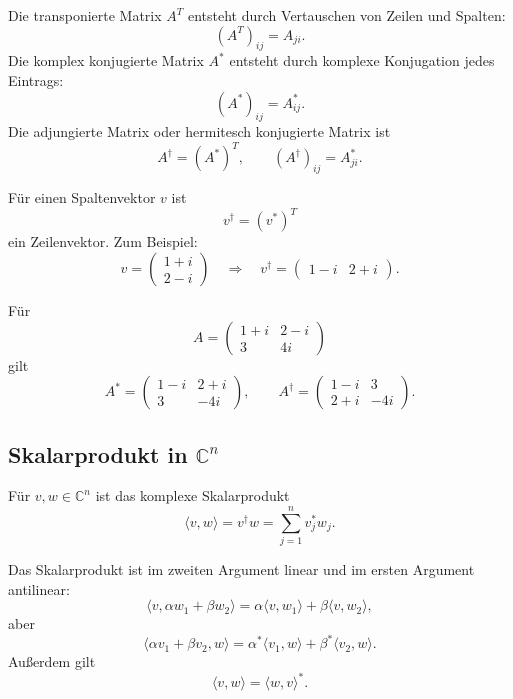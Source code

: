 \begin{definitionbox}
Die transponierte Matrix $A^T$ entsteht durch Vertauschen von Zeilen und Spalten:
\[
    (A^T)_{ij}=A_{ji}.
\]
Die komplex konjugierte Matrix $A^*$ entsteht durch komplexe Konjugation jedes Eintrags:
\[
    (A^*)_{ij}=A_{ij}^*.
\]
Die adjungierte Matrix oder hermitesch konjugierte Matrix ist
\[
    A^\dagger=(A^*)^T,
    \qquad (A^\dagger)_{ij}=A_{ji}^*.
\]
\end{definitionbox}

Für einen Spaltenvektor $v$ ist
\[
    v^\dagger = (v^*)^T
\]
ein Zeilenvektor. Zum Beispiel:
\[
    v=\begin{pmatrix}1+i\\ 2-i\end{pmatrix}
    \quad\Rightarrow\quad
    v^\dagger=\begin{pmatrix}1-i & 2+i\end{pmatrix}.
\]

\begin{examplebox}
Für
\[
    A=\begin{pmatrix}
        1+i & 2-i\\
        3 & 4i
    \end{pmatrix}
\]
gilt
\[
    A^*=
    \begin{pmatrix}
        1-i & 2+i\\
        3 & -4i
    \end{pmatrix},
    \qquad
    A^\dagger=
    \begin{pmatrix}
        1-i & 3\\
        2+i & -4i
    \end{pmatrix}.
\]
\end{examplebox}

\subsection{Skalarprodukt in $\mathbb{C}^n$}

\begin{definitionbox}
Für $v,w\in\mathbb{C}^n$ ist das komplexe Skalarprodukt
\[
    \langle v,w\rangle = v^\dagger w
    = \sum_{j=1}^{n} v_j^*w_j.
\]
\end{definitionbox}

Das Skalarprodukt ist im zweiten Argument linear und im ersten Argument antilinear:
\[
    \langle v,\alpha w_1+\beta w_2\rangle
    =\alpha\langle v,w_1\rangle+\beta\langle v,w_2\rangle,
\]
aber
\[
    \langle \alpha v_1+\beta v_2,w\rangle
    =\alpha^*\langle v_1,w\rangle+\beta^*\langle v_2,w\rangle.
\]
Außerdem gilt
\[
    \langle v,w\rangle = \langle w,v\rangle^*.
\]

